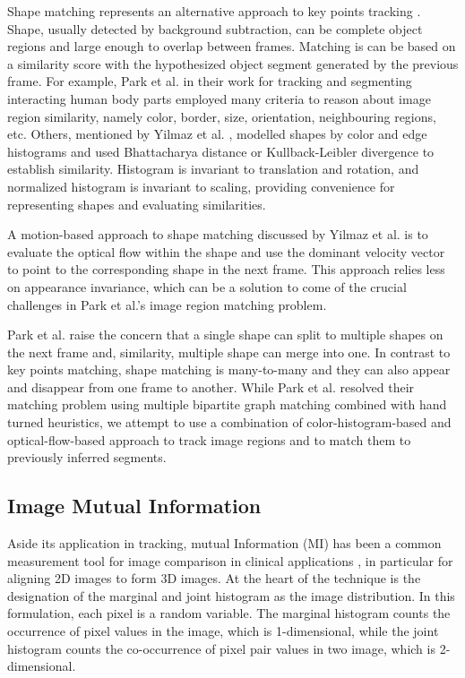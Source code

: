 \documentclass{article}
\begin{document}
Shape matching represents an alternative approach to key points tracking \cite{tracking}. Shape, usually detected by background subtraction, can be complete object regions and large enough to overlap between frames. Matching is can be based on a similarity score with the hypothesized object segment generated by the previous frame. For example, Park et al. in their work for tracking and segmenting interacting human body parts \cite{human-action} employed many criteria to reason about image region similarity, namely color, border, size, orientation, neighbouring regions, etc. Others, mentioned by Yilmaz et al. \cite{tracking}, modelled shapes by color and edge histograms and used Bhattacharya distance or Kullback-Leibler divergence to establish similarity. Histogram is invariant to translation and rotation, and normalized histogram is invariant to scaling, providing convenience for representing shapes and evaluating similarities.

A motion-based approach to shape matching discussed by Yilmaz et al. \cite{tracking} is to evaluate the optical flow within the shape and use the dominant velocity vector to point to the corresponding shape in the next frame. This approach relies less on appearance invariance, which can be a solution to come of the crucial challenges in Park et al.'s image region matching problem.

Park et al. \cite{human-action} raise the concern that a single shape can split to multiple shapes on the next frame and, similarity, multiple shape can merge into one. In contrast to key points matching, shape matching is many-to-many and they can also appear and disappear from one frame to another. While Park et al. resolved their matching problem using multiple bipartite graph matching combined with hand turned heuristics, we attempt to use a combination of color-histogram-based and optical-flow-based approach to track image regions and to match them to previously inferred segments. 

\subsection{Image Mutual Information}

Aside its application in tracking, mutual Information (MI) has been a common measurement tool for image comparison in clinical applications \cite{mi}, in particular for aligning 2D images to form 3D images. At the heart of the technique is the designation of the marginal and joint histogram as the image distribution. In this formulation, each pixel is a random variable. The marginal histogram counts the occurrence of pixel values in the image, which is 1-dimensional, while the joint histogram counts the co-occurrence of pixel pair values in two image, which is 2-dimensional. 
\end{document}
